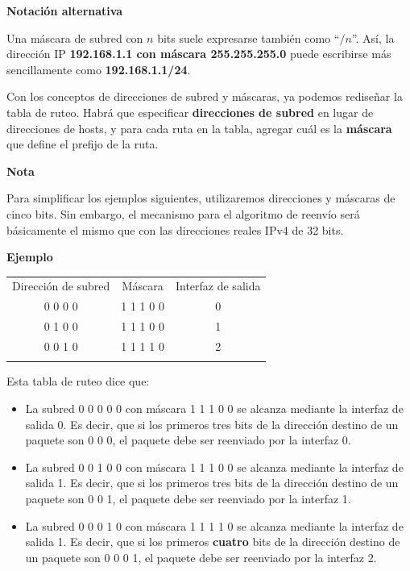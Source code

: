 \documentclass[spanish,A4,]{article}
\begin{document}
\textbf{Notación alternativa}

Una máscara de subred con $n$ bits suele expresarse también como
``$/n$''. Así, la dirección IP \textbf{192.168.1.1 con máscara
255.255.255.0} puede escribirse más sencillamente como
\textbf{192.168.1.1/24}.

Con los conceptos de direcciones de subred y máscaras, ya podemos
rediseñar la tabla de ruteo. Habrá que especificar \textbf{direcciones
de subred} en lugar de direcciones de hosts, y para cada ruta en la
tabla, agregar cuál es la \textbf{máscara} que define el prefijo de la
ruta.

\textbf{Nota}

Para simplificar los ejemplos siguientes, utilizaremos direcciones y
máscaras de cinco bits. Sin embargo, el mecanismo para el algoritmo de
reenvío será básicamente el mismo que con las direcciones reales IPv4 de
32 bits.

\textbf{Ejemplo}

\begin{longtable}[c]{@{}ccc@{}}
\toprule\addlinespace
Dirección de subred & Máscara & Interfaz de salida
\\\addlinespace
\midrule\endhead
0 0 0 0 0 & 1 1 1 0 0 & 0
\\\addlinespace
0 0 1 0 0 & 1 1 1 0 0 & 1
\\\addlinespace
0 0 0 1 0 & 1 1 1 1 0 & 2
\\\addlinespace
\bottomrule
\end{longtable}

Esta tabla de ruteo dice que:

\begin{itemize}
\itemsep1pt\parskip0pt
\item
  La subred 0 0 0 0 0 con máscara 1 1 1 0 0 se alcanza mediante la interfaz de
  salida 0. Es decir, que si los primeros tres bits de la dirección
  destino de un paquete son 0 0 0, el paquete debe ser reenviado por la
  interfaz 0.
\item
  La subred 0 0 1 0 0 con máscara 1 1 1 0 0 se alcanza mediante la interfaz de
  salida 1. Es decir, que si los primeros tres bits de la dirección
  destino de un paquete son 0 0 1, el paquete debe ser reenviado por la
  interfaz 1.
\item
  La subred 0 0 0 1 0 con máscara 1 1 1 1 0 se alcanza mediante la interfaz de
  salida 1. Es decir, que si los primeros \textbf{cuatro} bits de la
  dirección destino de un paquete son 0 0 0 1, el paquete debe ser
  reenviado por la interfaz 2.
\end{itemize}
\end{document}

